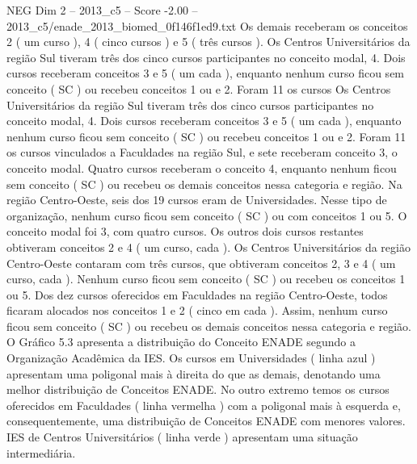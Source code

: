 \begin{textsample}{NEG Dim 2 – 2013\_c5 – Score -2.00 – 2013\_c5/enade\_2013\_biomed\_0f146f1ed9.txt}
Os demais receberam os conceitos 2 ( um curso ), 4 ( cinco cursos ) e 5 ( três cursos ).
Os Centros Universitários da região Sul tiveram três dos cinco cursos participantes no conceito modal, 4.
Dois cursos receberam conceitos 3 e 5 ( um cada ), enquanto nenhum curso ficou sem conceito ( SC ) ou recebeu conceitos 1 ou e 2.
Foram 11 os cursos Os Centros Universitários da região Sul tiveram três dos cinco cursos participantes no conceito modal, 4.
Dois cursos receberam conceitos 3 e 5 ( um cada ), enquanto nenhum curso ficou sem conceito ( SC ) ou recebeu conceitos 1 ou e 2.
Foram 11 os cursos vinculados a Faculdades na região Sul, e sete receberam conceito 3, o conceito modal.
Quatro cursos receberam o conceito 4, enquanto nenhum ficou sem conceito ( SC ) ou recebeu os demais conceitos nessa categoria e região.
Na região Centro-Oeste, seis dos 19 cursos eram de Universidades.
Nesse tipo de organização, nenhum curso ficou sem conceito ( SC ) ou com conceitos 1 ou 5.
O conceito modal foi 3, com quatro cursos.
Os outros dois cursos restantes obtiveram conceitos 2 e 4 ( um curso, cada ).
Os Centros Universitários da região Centro-Oeste contaram com três cursos, que obtiveram conceitos 2, 3 e 4 ( um curso, cada ).
Nenhum curso ficou sem conceito ( SC ) ou recebeu os conceitos 1 ou 5.
Dos dez cursos oferecidos em Faculdades na região Centro-Oeste, todos ficaram alocados nos conceitos 1 e 2 ( cinco em cada ).
Assim, nenhum curso ficou sem conceito ( SC ) ou recebeu os demais conceitos nessa categoria e região.
O Gráfico 5.3 apresenta a distribuição do Conceito ENADE segundo a Organização Acadêmica da IES.
Os cursos em Universidades ( linha azul ) apresentam uma poligonal mais à direita do que as demais, denotando uma melhor distribuição de Conceitos ENADE.
No outro extremo temos os cursos oferecidos em Faculdades ( linha vermelha ) com a poligonal mais à esquerda e, consequentemente, uma distribuição de Conceitos ENADE com menores valores.
IES de Centros Universitários ( linha verde ) apresentam uma situação intermediária.

\end{textsample}
